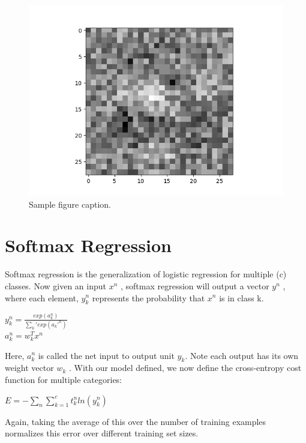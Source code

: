 \documentclass{article} %
\begin{document}
\begin{figure}[h]
\begin{center}
\includegraphics[width=\linewidth]{2vs8.png}
\end{center}
\caption{Sample figure caption.}
\end{figure}

\section{Softmax Regression}
Softmax regression is the generalization of logistic regression for multiple (c) classes. Now given an input $x^n$ , softmax regression will output a vector $y^n$ , where each element, $y_k^n$ represents the probability that $x^n$ is in class k.\\
\begin{center}
$y_k^n = \frac{exp(a_{k}^n)}{\sum_k' exp(a_k'^n)}$\\
$a_{k}^n = w_k^T x^n$\\
\end{center}

Here, $a_{k}^n$ is called the net input to output unit $y_k$. Note each output has its own weight vector $w_k$ . With our model defined, we now define the cross-entropy cost function for multiple categories:
\begin{center}
$E = −\sum_n \sum_{k=1}^{c} t^n_k ln(y_k^n)$
\end{center}

Again, taking the average of this over the number of training examples normalizes this error over different training set sizes.
\end{document}
